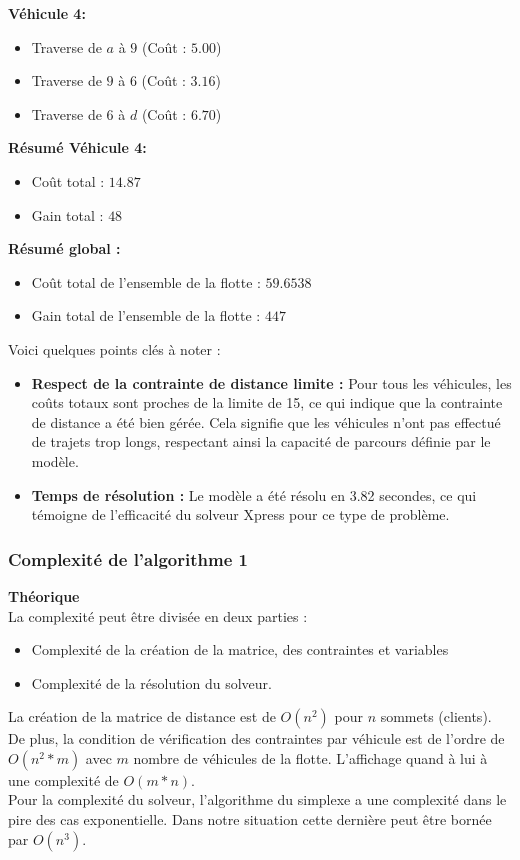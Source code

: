 \documentclass[a4paper, 12pt, DIV=12]{scrartcl}
\begin{document}
\textbf{Véhicule 4:}
\begin{itemize}
    \item Traverse de $a$ à $9$ (Coût : $5.00$)
    \item Traverse de $9$ à $6$ (Coût : $3.16$)
    \item Traverse de $6$ à $d$ (Coût : $6.70$)
\end{itemize}
\textbf{Résumé Véhicule 4:}
\begin{itemize}
    \item Coût total : $14.87$
    \item Gain total : $48$\\
\end{itemize}

\textbf{Résumé global :}
\begin{itemize}
    \item Coût total de l'ensemble de la flotte  : $59.6538$
    \item Gain total de l'ensemble de la flotte : $447$\\[5pt]
\end{itemize}
Voici quelques points clés à noter :
\begin{itemize}
    \item \textbf{Respect de la contrainte de distance limite :}
     Pour tous les véhicules, les coûts totaux sont proches de la limite de 15, ce qui indique que la contrainte de distance a été bien gérée. Cela signifie que les véhicules n'ont pas effectué de trajets trop longs, respectant ainsi la capacité de parcours définie par le modèle.
     \item \textbf{Temps de résolution :} Le modèle a été résolu en 3.82 secondes, ce qui témoigne de l'efficacité du solveur Xpress pour ce type de problème.
\end{itemize}


\subsubsection{Complexité de l'algorithme 1}
\textbf{Théorique} \\[5pt]
La complexité peut être divisée en deux parties :
\begin{itemize}
    \item Complexité de la création de la matrice, des contraintes et variables
    \item Complexité de la résolution du solveur. 
\end{itemize}

La création de la matrice de distance est de $O(n^2)$ pour $n$ sommets (clients). De plus, la condition de vérification des contraintes par véhicule est de l'ordre de $O(n^2*m)$ avec $m$ nombre de véhicules de la flotte. L'affichage quand à lui à une complexité de $O(m*n)$. \\[5pt]
Pour la complexité du solveur, l'algorithme du simplexe a une complexité dans le pire des cas exponentielle. Dans notre situation cette dernière peut être bornée par $O(n^3)$. \\
\end{document}
